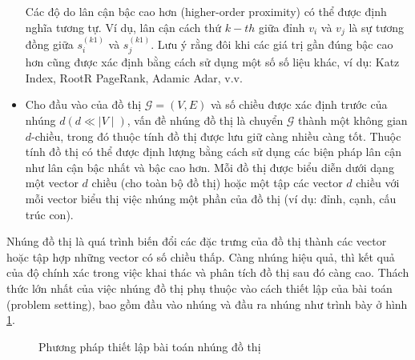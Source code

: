\begin{itemize}
	Các độ do lân cận bậc cao hơn (higher-order proximity) có thể được định nghĩa tương tự. Ví dụ, lân cận cách thứ $k-th$ giữa đỉnh $v_i$ và $v_j$ là sự tương đồng giữa $s^{(k 1)}_i$ và $s^{(k 1)}_j$. Lưu ý rằng đôi khi các giá trị gần đúng bậc cao hơn cũng được xác định bằng cách sử dụng một số số liệu khác, ví dụ: Katz Index, RootR PageRank, Adamic Adar, v.v.
	
	\item
	\begin{definition}\label{def:graphEmbedding}
		Cho đầu vào của đồ thị \(\mathcal{G} = (V, E)\) và số chiều được xác định trước của nhúng $d (d \ll \mid V \mid)$, vấn đề nhúng đồ thị là chuyển $\mathcal{G}$ thành một không gian \(d\)-chiều, trong đó thuộc tính đồ thị được lưu giữ càng nhiều càng tốt. Thuộc tính đồ thị có thể được định lượng bằng cách sử dụng các biện pháp lân cận như lân cận bậc nhất và bậc cao hơn. Mỗi đồ thị được biểu diễn dưới dạng một vector $d$ chiều (cho toàn bộ đồ thị) hoặc một tập các vector $d$ chiều với mỗi vector biểu thị việc nhúng một phần của đồ thị (ví dụ: đỉnh, cạnh, cấu trúc con).
	\end{definition}
	
\end{itemize}

Nhúng đồ thị là quá trình biến đổi các đặc trưng của đồ thị thành các vector hoặc tập hợp những vector có số chiều thấp. Càng nhúng hiệu quả, thì kết quả của độ chính xác trong việc khai thác và phân tích đồ thị sau đó càng cao. Thách thức lớn nhất của việc nhúng đồ thị phụ thuộc vào cách thiết lập của bài toán (problem setting), bao gồm đầu vào nhúng và đầu ra nhúng như trình bày ở hình \ref{fig:graphEmbeddingSettingTree}.

\begin{figure}[htp]
	\centering
	\caption{Phương pháp thiết lập bài toán nhúng đồ thị}
	\label{fig:graphEmbeddingSettingTree}
\end{figure}

